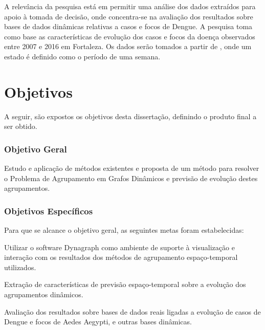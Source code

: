 A relevância da pesquisa está em permitir uma análise dos dados extraídos 
para apoio à tomada de decisão, onde concentra-se na avaliação dos resultados sobre bases de dados
dinâmicas relativas a casos e focos de Dengue.
A pesquisa toma como base as características de evolução dos casos e focos da doença
observados entre 2007 e 2016 em Fortaleza.
Os dados serão tomados a partir de \cite{simda}, onde um estado é definido como o período de uma semana. 


\label{sec:objetivos}
\chapter{Objetivos}

A seguir, são expostos os objetivos desta dissertação, definindo o produto
final a ser obtido.

\subsection{Objetivo Geral}
\label{sec:objetivo-geral}

Estudo e aplicação de métodos existentes e proposta de um método para resolver o Problema de Agrupamento
em Grafos Dinâmicos e previsão de evolução destes agrupamentos.

\subsection{Objetivos Específicos}
\label{sec:objetivos-especificos}

Para que se alcance o objetivo geral, as seguintes metas foram estabelecidas:

\begin{alineas}
	\item Utilizar o software Dynagraph como ambiente de suporte à visualização e interação com os resultados dos métodos de agrupamento espaço-temporal utilizados.
	\item Extração de características de previsão espaço-temporal sobre a evolução dos agrupamentos dinâmicos.
	\item Avaliação dos resultados sobre bases de dados reais ligadas a evolução de casos de Dengue e focos de Aedes Aegypti, e outras bases dinâmicas.
\end{alineas}
